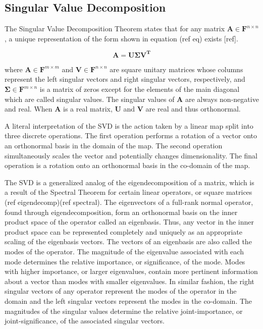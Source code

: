 \documentclass[conference]{IEEEtran}
\begin{document}
    \subsection{Singular Value Decomposition}
    The Singular Value Decomposition Theorem states that for any matrix $\mathbf{A} \in \mathbf{F}^{n \times n}$, a unique representation of the form shown in equation (ref eq) exists [ref].

     \begin{equation*}{\mathbf{A}} = {\mathbf{U\Sigma }}{{\mathbf{V}}^{\mathbf{T}}}\tag{2}\end{equation*}

    where $\mathbf{A} \in \mathbf{F}^{m \times m}$ and $\mathbf{V} \in \mathbf{F}^{n \times n}$ are square unitary
    matrices whose columns represent the left singular vectors and right singular vectors, respectively, and $\mathbf{\Sigma} \in \mathbf{F}^{m \times n}$ is a matrix of zeros except for the elements of the main diagonal which are called singular values. The singular values of $\mathbf{A}$ are always non-negative and real. When $\mathbf{A}$ is a real matrix, $\mathbf{U}$ and $\mathbf{V}$ are real and thus orthonormal.

    A literal interpretation of the SVD is the action taken by a linear map split into three discrete operations. The first operation performs a rotation of a vector onto an orthonormal basis in the domain of the map. The second operation simultaneously scales the vector and potentially changes dimensionality. The final operation is a rotation onto an orthonormal basis in the co-domain of the map.

    The SVD is a generalized analog of the eigendecomposition of a matrix, which is a result of the Spectral Theorem for certain linear operators, or square matrices (ref eigendecomp)(ref spectral). The eigenvectors of a full-rank normal operator, found through eigendecomposition, form an orthonormal basis on the inner product space of the operator called an eigenbasis. Thus, any vector in the inner product space can be represented completely and uniquely as an appropriate scaling of the eigenbasis vectors. The vectors of an eigenbasis are also called the modes of the operator. The magnitude of the eigenvalue associated with each mode determines the relative importance, or significance, of the mode. Modes with higher importance, or larger eigenvalues, contain more pertinent information about a vector than modes with smaller eigenvalues. In similar fashion, the right singular vectors of any operator represent the modes of the operator in the domain and the left singular vectors represent the modes in the co-domain. The magnitudes of the singular values determine the relative joint-importance, or joint-significance, of the associated singular vectors.
    
\end{document}
